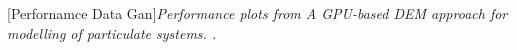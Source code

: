 \begin{multiFigure}
\centering
{
 \qquad
{} \qquad
}
[Perfornamce Data Gan]{\textit{Performance plots from \textit{A GPU-based DEM approach for modelling of particulate systems.} \citep{gan2016}.}}
\label{fig:Perf_gan2016}
\end{multiFigure}
